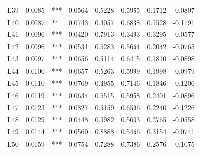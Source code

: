\begin{tabular}{lrlrrrrr}
L39     &    0.0085 &  *** &   0.0564 &  0.5228 &        0.5965 &  0.1712 &    -0.0807 \\
L40     &    0.0087 &   ** &   0.0743 &  0.4057 &        0.6838 &  0.1528 &    -0.1191 \\
L41     &    0.0096 &  *** &   0.0420 &  0.7913 &        0.3493 &  0.3295 &    -0.0577 \\
L42     &    0.0096 &  *** &   0.0531 &  0.6283 &        0.5664 &  0.2042 &    -0.0765 \\
L43     &    0.0097 &  *** &   0.0656 &  0.5114 &        0.6415 &  0.1810 &    -0.0898 \\
L44     &    0.0100 &  *** &   0.0657 &  0.5263 &        0.5999 &  0.1998 &    -0.0979 \\
L45     &    0.0110 &  *** &   0.0769 &  0.4955 &        0.7146 &  0.1846 &    -0.1206 \\
L46     &    0.0119 &  *** &   0.0634 &  0.6515 &        0.5958 &  0.2401 &    -0.0896 \\
L47     &    0.0123 &  *** &   0.0827 &  0.5159 &        0.6596 &  0.2240 &    -0.1226 \\
L48     &    0.0129 &  *** &   0.0448 &  0.9982 &        0.5603 &  0.2765 &    -0.0558 \\
L49     &    0.0144 &  *** &   0.0560 &  0.8888 &        0.5466 &  0.3154 &    -0.0741 \\
L50     &    0.0159 &  *** &   0.0754 &  0.7288 &        0.7386 &  0.2576 &    -0.1075 \\
\bottomrule
\end{tabular}
